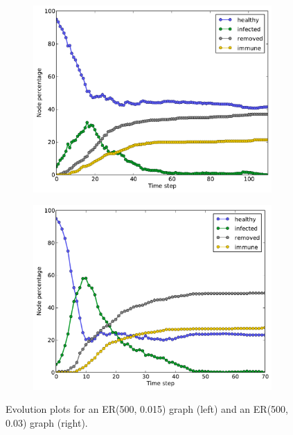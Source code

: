 \documentclass[11pt]{article} %
\begin{document}
\begin{figure}[tbp]
  \begin{subfigure}[b]{0.5\textwidth}
    \centering
    \includegraphics[width=\textwidth]{figures/evo_ER_500_0015}
  \end{subfigure}
  \begin{subfigure}[b]{0.5\textwidth}
    \centering
    \includegraphics[width=\textwidth]{figures/evo_ER_500_003}
  \end{subfigure}
  \caption{Evolution plots for an ER(500, 0.015) graph (left) and an
    ER(500, 0.03) graph (right).}
  \label{fig:er_evo}
\end{figure}
\end{document}
